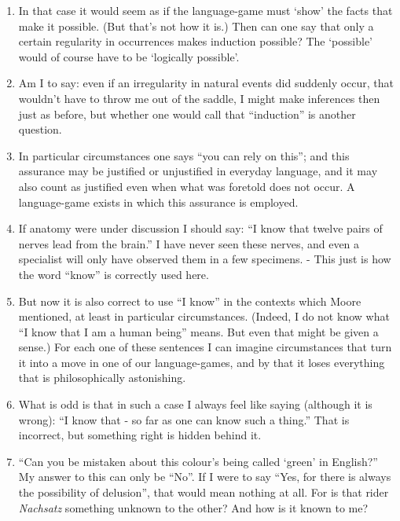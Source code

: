 \documentclass{book}
\begin{document}
\begin{enumerate}
\item
In that case it would seem as if the language-game must `show' the facts that
make it possible. (But that's not how it is.) Then can one say that only a
certain regularity in occurrences makes induction possible? The `possible'
would of course have to be `logically possible'.

\item
Am I to say: even if an irregularity in natural events did suddenly occur, that
wouldn't have to throw me out of the saddle, I might make inferences then just
as before, but whether one would call that ``induction'' is another question.

\item
In particular circumstances one says ``you can rely on this''; and this
assurance may be justified or unjustified in everyday language, and it may also
count as justified even when what was foretold does not occur. A language-game
exists in which this assurance is employed.

\item
If anatomy were under discussion I should say: ``I know that twelve pairs of
nerves lead from the brain.'' I have never seen these nerves, and even a
specialist will only have observed them in a few specimens. - This just is how
the word ``know'' is correctly used here.

\item
But now it is also correct to use ``I know'' in the contexts which Moore
mentioned, at least in particular circumstances. (Indeed, I do not know what
``I know that I am a human being'' means. But even that might be given a
sense.) For each one of these sentences I can imagine circumstances that turn
it into a move in one of our language-games, and by that it loses everything
that is philosophically astonishing.

\item
What is odd is that in such a case I always feel like saying (although it is
wrong): ``I know that - so far as one can know such a thing.'' That is
incorrect, but something right is hidden behind it.

\item
``Can you be mistaken about this colour's being called `green' in English?'' My
answer to this can only be ``No''. If I were to say ``Yes, for there is always
the possibility of delusion'', that would mean nothing at all.  For is that
rider \emph{Nachsatz} something unknown to the other? And how is it known to
me?


\end{enumerate}
\end{document}
